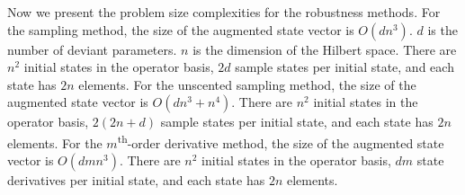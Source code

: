 Now we present the problem size complexities for the robustness methods.
For the sampling method, the size of the augmented state vector
is $O(dn^{3})$. $d$ is the number of deviant parameters.
$n$ is the dimension of the Hilbert space. There are $n^{2}$ initial states
in the operator basis, $2d$ sample states per initial state,
and each state has $2n$ elements.
For the unscented sampling method, the size of the augmented state vector
is $O(dn^{3} + n^{4})$.
There are $n^{2}$ initial states in the operator basis,
$2(2n + d)$ sample states per initial state,
and each state has $2n$ elements.
For the $m$\textsuperscript{th}-order derivative method, the size of the augmented state vector
is $O(dmn^{3})$. There are $n^{2}$
initial states in the operator basis, $dm$ state derivatives per initial state,
and each state has $2n$ elements.
